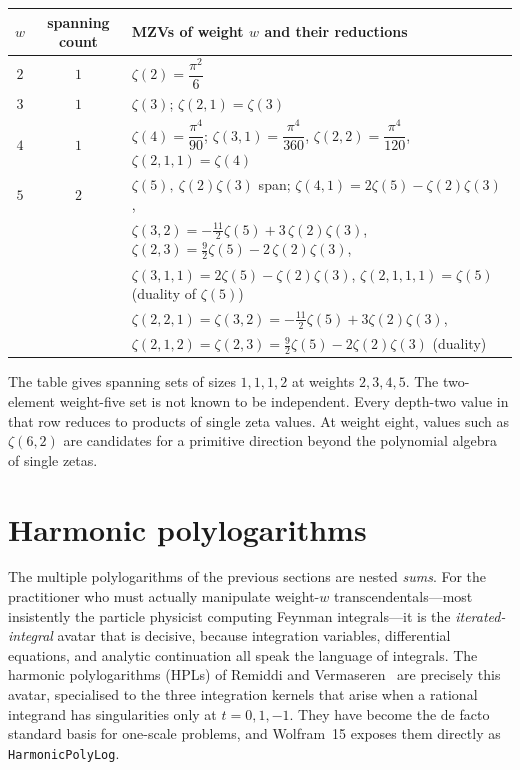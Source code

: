 \begin{center}
\renewcommand{\arraystretch}{1.25}
\begin{tabular}{c c l}
\hline
$w$ & spanning count & MZVs of weight $w$ and their reductions\\
\hline
$2$ & $1$ & $\zeta(2)=\dfrac{\pi^2}{6}$\\
$3$ & $1$ & $\zeta(3)$; \quad $\zeta(2,1)=\zeta(3)$\\
$4$ & $1$ & $\zeta(4)=\dfrac{\pi^4}{90}$; \quad $\zeta(3,1)=\dfrac{\pi^4}{360}$, \quad $\zeta(2,2)=\dfrac{\pi^4}{120}$, \quad $\zeta(2,1,1)=\zeta(4)$\\
$5$ & $2$ & $\zeta(5),\ \zeta(2)\zeta(3)$ span; \quad $\zeta(4,1)=2\zeta(5)-\zeta(2)\zeta(3)$,\\
    &     & $\zeta(3,2)=-\tfrac{11}{2}\zeta(5)+3\,\zeta(2)\zeta(3)$, \quad $\zeta(2,3)=\tfrac{9}{2}\zeta(5)-2\,\zeta(2)\zeta(3)$,\\
    &     & $\zeta(3,1,1)=2\zeta(5)-\zeta(2)\zeta(3)$, \quad $\zeta(2,1,1,1)=\zeta(5)$ (duality of $\zeta(5)$)\\
    &     & $\zeta(2,2,1)=\zeta(3,2)=-\tfrac{11}{2}\zeta(5)+3\zeta(2)\zeta(3)$,\\
    &     & $\zeta(2,1,2)=\zeta(2,3)=\tfrac92\zeta(5)-2\zeta(2)\zeta(3)$ (duality)\\
\hline
\end{tabular}
\end{center}

\noindent The table gives spanning sets of sizes $1,1,1,2$ at weights
$2,3,4,5$. The two-element weight-five set is not known to be independent.
Every depth-two value in that row reduces to products of single zeta values.
At weight eight, values such as $\zeta(6,2)$ are candidates for a primitive
direction beyond the polynomial algebra of single zetas.


\section{Harmonic polylogarithms}

The multiple polylogarithms of the previous sections are nested \emph{sums}. For the practitioner who must actually manipulate weight-$w$ transcendentals---most insistently the particle physicist computing Feynman integrals---it is the \emph{iterated-integral} avatar that is decisive, because integration variables, differential equations, and analytic continuation all speak the language of integrals. The harmonic polylogarithms (HPLs) of Remiddi and Vermaseren~\cite{RemiddiVermaseren} are precisely this avatar, specialised to the three integration kernels that arise when a rational integrand has singularities only at $t=0,1,-1$. They have become the de facto standard basis for one-scale problems, and Wolfram~15 exposes them directly as \texttt{HarmonicPolyLog}.

